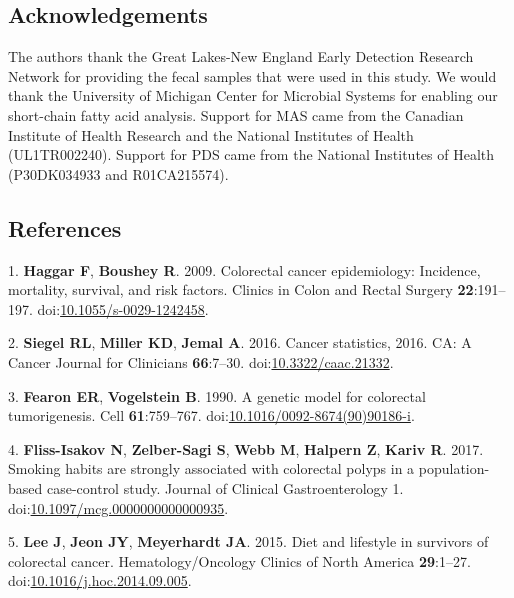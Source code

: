 \documentclass[11pt,]{article}
\begin{document}
\newpage

\hypertarget{acknowledgements}{%
\subsection{Acknowledgements}\label{acknowledgements}}

The authors thank the Great Lakes-New England Early Detection Research
Network for providing the fecal samples that were used in this study. We
would thank the University of Michigan Center for Microbial Systems for
enabling our short-chain fatty acid analysis. Support for MAS came from
the Canadian Institute of Health Research and the National Institutes of
Health (UL1TR002240). Support for PDS came from the National Institutes
of Health (P30DK034933 and R01CA215574).

\newpage

\hypertarget{references}{%
\subsection{References}\label{references}}

\hypertarget{refs}{}
\leavevmode\hypertarget{ref-Haggar2009}{}%
1. \textbf{Haggar F}, \textbf{Boushey R}. 2009. Colorectal cancer
epidemiology: Incidence, mortality, survival, and risk factors. Clinics
in Colon and Rectal Surgery \textbf{22}:191--197.
doi:\href{https://doi.org/10.1055/s-0029-1242458}{10.1055/s-0029-1242458}.

\leavevmode\hypertarget{ref-Siegel2016}{}%
2. \textbf{Siegel RL}, \textbf{Miller KD}, \textbf{Jemal A}. 2016.
Cancer statistics, 2016. CA: A Cancer Journal for Clinicians
\textbf{66}:7--30.
doi:\href{https://doi.org/10.3322/caac.21332}{10.3322/caac.21332}.

\leavevmode\hypertarget{ref-Fearon1990}{}%
3. \textbf{Fearon ER}, \textbf{Vogelstein B}. 1990. A genetic model for
colorectal tumorigenesis. Cell \textbf{61}:759--767.
doi:\href{https://doi.org/10.1016/0092-8674(90)90186-i}{10.1016/0092-8674(90)90186-i}.

\leavevmode\hypertarget{ref-FlissIsakov2017}{}%
4. \textbf{Fliss-Isakov N}, \textbf{Zelber-Sagi S}, \textbf{Webb M},
\textbf{Halpern Z}, \textbf{Kariv R}. 2017. Smoking habits are strongly
associated with colorectal polyps in a population-based case-control
study. Journal of Clinical Gastroenterology 1.
doi:\href{https://doi.org/10.1097/mcg.0000000000000935}{10.1097/mcg.0000000000000935}.

\leavevmode\hypertarget{ref-Lee2015}{}%
5. \textbf{Lee J}, \textbf{Jeon JY}, \textbf{Meyerhardt JA}. 2015. Diet
and lifestyle in survivors of colorectal cancer. Hematology/Oncology
Clinics of North America \textbf{29}:1--27.
doi:\href{https://doi.org/10.1016/j.hoc.2014.09.005}{10.1016/j.hoc.2014.09.005}.
\end{document}
